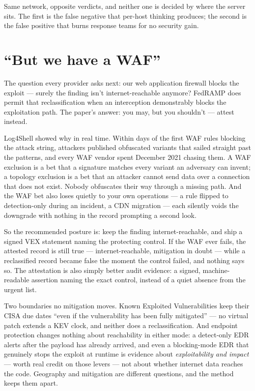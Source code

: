 \documentclass[11pt]{article}
\begin{document}
Same network, opposite verdicts, and neither one is decided by where the server
sits. The first is the false negative that per-host thinking produces; the second
is the false positive that burns response teams for no security gain.

\section*{``But we have a WAF''}
The question every provider asks next: our web application firewall blocks the
exploit --- surely the finding isn't internet-reachable anymore? FedRAMP does
permit that reclassification when an interception demonstrably blocks the
exploitation path. The paper's answer: you may, but you shouldn't --- attest
instead.

Log4Shell showed why in real time. Within days of the first WAF rules blocking the
attack string, attackers published obfuscated variants that sailed straight past
the patterns, and every WAF vendor spent December 2021 chasing them. A WAF
exclusion is a bet that a signature matches every variant an adversary can invent;
a topology exclusion is a bet that an attacker cannot send data over a connection
that does not exist. Nobody obfuscates their way through a missing path. And the
WAF bet also loses quietly to your own operations --- a rule flipped to
detection-only during an incident, a CDN migration --- each silently voids the
downgrade with nothing in the record prompting a second look.

So the recommended posture is: keep the finding internet-reachable, and ship a
signed VEX statement naming the protecting control. If the WAF ever fails, the
attested record is still true --- internet-reachable, mitigation in doubt --- while
a reclassified record became false the moment the control failed, and nothing says
so. The attestation is also simply better audit evidence: a signed,
machine-readable assertion naming the exact control, instead of a quiet absence
from the urgent list.

Two boundaries no mitigation moves. Known Exploited Vulnerabilities keep their
CISA due dates ``even if the vulnerability has been fully mitigated'' --- no
virtual patch extends a KEV clock, and neither does a reclassification. And
endpoint protection changes nothing about reachability in either mode: a
detect-only EDR alerts after the payload has already arrived, and even a
blocking-mode EDR that genuinely stops the exploit at runtime is evidence about
\emph{exploitability and impact} --- worth real credit on those levers --- not
about whether internet data reaches the code. Geography and mitigation are
different questions, and the method keeps them apart.
\end{document}
